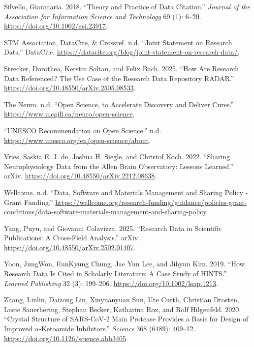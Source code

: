 \documentclass[
  letterpaper,
  DIV=11,
  numbers=noendperiod]{scrartcl}
\newlength{\cslhangindent}
\newenvironment{CSLReferences}[2] %
 {\begin{list}{}{%
  \setlength{\itemindent}{0pt}
  \setlength{\leftmargin}{0pt}
  \setlength{\parsep}{0pt}
  \ifodd #1
   \setlength{\leftmargin}{\cslhangindent}
   \setlength{\itemindent}{-1\cslhangindent}
  \fi
  \setlength{\itemsep}{#2\baselineskip}}}
 {\end{list}}
\begin{document}
\begin{CSLReferences}{1}{0}
Silvello, Gianmaria. 2018. {``Theory and Practice of Data Citation.''}
\emph{Journal of the Association for Information Science and Technology}
69 (1): 6--20. \url{https://doi.org/10.1002/asi.23917}.

STM Association, DataCite, \& Crossref. n.d. {``Joint {Statement} on
{Research Data}.''} DataCite.
\url{https://datacite.org/blog/joint-statement-on-research-data/}.

Strecker, Dorothea, Kerstin Soltau, and Felix Bach. 2025. {``How Are
Research Data Referenced? The Use Case of the Research Data Repository
RADAR.''} \url{https://doi.org/10.48550/arXiv.2505.08533}.

The Neuro. n.d. {``Open Science, to Accelerate Discovery and Deliver
Cures.''} \url{https://www.mcgill.ca/neuro/open-science}.

{``UNESCO Recommendation on Open Science.''} n.d.
\url{https://www.unesco.org/en/open-science/about}.

Vries, Saskia E. J. de, Joshua H. Siegle, and Christof Koch. 2022.
{``Sharing {Neurophysiology Data} from the {Allen Brain Observatory}:
{Lessons Learned}.''} arXiv.
\url{https://doi.org/10.48550/arXiv.2212.08638}.

Wellcome. n.d. {``Data, Software and Materials Management and Sharing
Policy - Grant Funding.''}
\url{https://wellcome.org/research-funding/guidance/policies-grant-conditions/data-software-materials-management-and-sharing-policy}.

Yang, Puyu, and Giovanni Colavizza. 2025. {``Research {Data} in
{Scientific Publications}: {A Cross-Field Analysis}.''} arXiv.
\url{https://doi.org/10.48550/arXiv.2502.01407}.

Yoon, JungWon, EunKyung Chung, Jae Yun Lee, and Jihyun Kim. 2019. {``How
Research Data Is Cited in Scholarly Literature: A Case Study of
HINTS.''} \emph{Learned Publishing} 32 (3): 199--206.
\url{https://doi.org/10.1002/leap.1213}.

Zhang, Linlin, Daizong Lin, Xinyuanyuan Sun, Ute Curth, Christian
Drosten, Lucie Sauerhering, Stephan Becker, Katharina Rox, and Rolf
Hilgenfeld. 2020. {``Crystal Structure of {SARS-CoV-2} Main Protease
Provides a Basis for Design of Improved {\(\alpha\)}-Ketoamide
Inhibitors.''} \emph{Science} 368 (6489): 409--12.
\url{https://doi.org/10.1126/science.abb3405}.


\end{CSLReferences}
\end{document}
